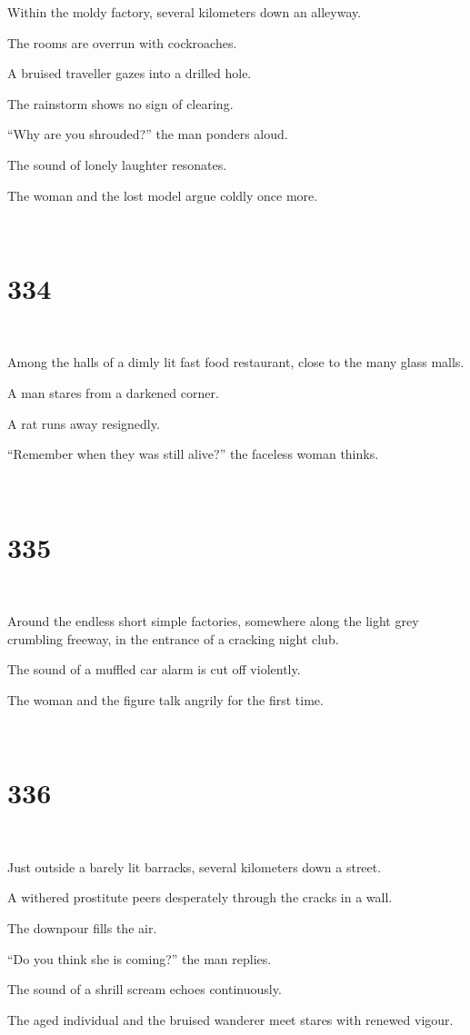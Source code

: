 \documentclass{report}
\begin{document}
Within the moldy factory, several kilometers down an alleyway.

The rooms are overrun with cockroaches.

A bruised traveller gazes into a drilled hole.

The rainstorm shows no sign of clearing.

``Why are you shrouded?'' the man ponders aloud.

The sound of lonely laughter resonates.

The woman and the lost model argue coldly once more.

~
\chapter*{334}
~

Among the halls of a dimly lit fast food restaurant, close to the many glass malls.

A man stares from a darkened corner.

A rat runs away resignedly.

``Remember when they was still alive?'' the faceless woman thinks.

~
\chapter*{335}
~

Around the endless short simple factories, somewhere along the light grey crumbling freeway, in the entrance of a cracking night club.

The sound of a muffled car alarm is cut off violently.

The woman and the figure talk angrily for the first time.

~
\chapter*{336}
~

Just outside a barely lit barracks, several kilometers down a street.

A withered prostitute peers desperately through the cracks in a wall.

The downpour fills the air.

``Do you think she is coming?'' the man replies.

The sound of a shrill scream echoes continuously.

The aged individual and the bruised wanderer meet stares with renewed vigour.
\end{document}
